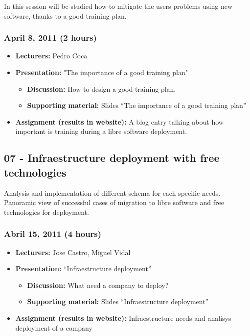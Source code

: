 \documentclass[a4paper]{article}
\begin{document}
In this session will be studied how to mitigate the users problems using new software, thanks to a good training plan.  

\subsubsection{April 8, 2011 (2 hours)}

\begin{itemize}
\item \textbf{Lecturers:} Pedro Coca
\item \textbf{Presentation:} "The importance of a good training plan"
  \begin{itemize}
  \item \textbf{Discussion:} How to design a good training plan. 
  \item \textbf{Supporting material:} Slides ``The importance of a good training plan''
  \end{itemize}
\item \textbf{Assignment (results in website):} A blog entry talking about how important is training during a libre software deployment. 
\end{itemize}


\subsection{07 - Infraestructure deployment with free technologies}

Analysis and implementation of different schema for each specific needs. Panoramic view of successful cases of migration to libre software and free technologies for deployment. 

\subsubsection{Abril 15, 2011 (4 hours)}


\begin{itemize}
\item \textbf{Lecturers:} Jose Castro, Miguel Vidal
\item \textbf{Presentation:} ``Infraestructure deployment''
  \begin{itemize}
  \item \textbf{Discussion:} What need a company to deploy?
  \item \textbf{Supporting material:} Slides ``Infraestructure deployment''
  \end{itemize}
\item \textbf{Assignment (results in website):} Infraestructure needs and analisys deployment of a company
\end{itemize}
\end{document}
